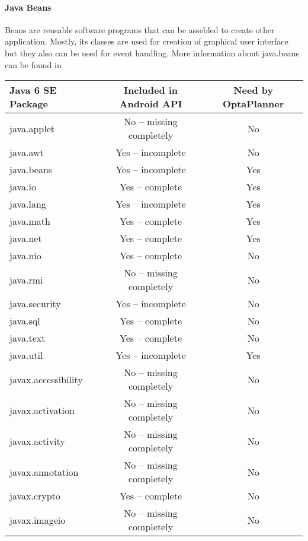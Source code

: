\paragraph{Java Beans}
Beans are reusable software programs that can be assebled to create other application. Mostly, its classes are used for creation of graphical user interface but they also can be used for event handling. More information about java.beans can be found in \cite{}

\begin {table}[h!]
\begin{tabular}{|l|c|c|}
\hline
{\bf Java 6 SE Package} & {\bf Included in Android API} & {\bf Need by OptaPlanner} \\
\hline \hline
java.applet           & No -- missing completely  & No\\
java.awt              & Yes -- incomplete         & No\\
java.beans            & Yes -- incomplete         & Yes\\
java.io               & Yes -- complete           & Yes\\
java.lang             & Yes -- incomplete         & Yes\\
java.math             & Yes -- complete           & Yes\\
java.net              & Yes -- complete           & Yes\\
java.nio              & Yes -- complete           & No\\
java.rmi              & No -- missing completely  & No\\
java.security         & Yes -- incomplete         & No\\
java.sql              & Yes -- complete           & No\\
java.text             & Yes -- complete           & No\\
java.util             & Yes -- incomplete         & Yes\\
javax.accessibility   & No -- missing completely  & No\\
javax.activation      & No -- missing completely  & No\\
javax.activity        & No -- missing completely  & No\\
javax.annotation      & No -- missing completely  & No\\
javax.crypto          & Yes -- complete           & No\\
javax.imageio         & No -- missing completely  & No\\

\end{tabular}
\end{table}

